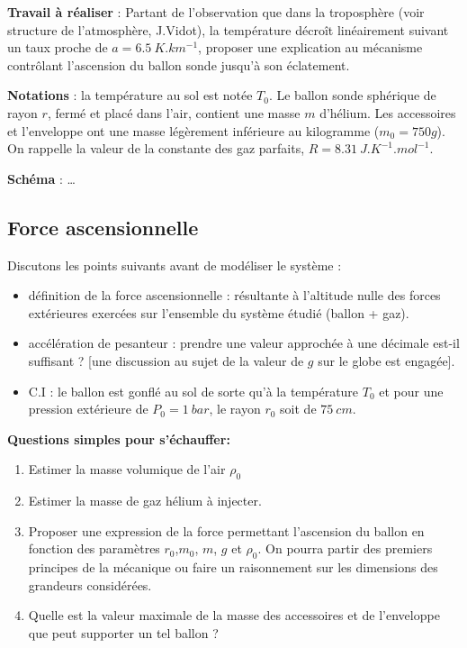 \documentclass[letterpaper]{article}
\begin{document}
\bigskip

\textbf{\textbf{Travail à réaliser}} : Partant de l'observation que dans la troposphère (voir structure de l’atmosphère, J.Vidot), la température décroît linéairement suivant un taux proche de  \(a = 6.5~K.km^{-1}\), proposer une explication au mécanisme contrôlant l'ascension du ballon sonde jusqu'à son éclatement.

\bigskip

\textbf{\textbf{Notations}} : la température au sol est notée \(T_0\). Le ballon sonde sphérique de rayon \(r\), fermé et placé dans l’air, contient une masse \(m\) d’hélium. Les accessoires et l'enveloppe ont une masse légèrement inférieure au kilogramme (\(m_{0} = 750 g\)).
On rappelle la valeur de la constante des gaz parfaits, \(R = 8.31 ~J.K^{-1}.mol^{-1}\).

\bigskip

\textbf{\textbf{Schéma}} : \ldots{}


\newpage

\subsection{Force ascensionnelle}
\label{sec:org6f8fd14}

Discutons les points suivants avant de modéliser le système : 

\begin{itemize}
\item définition de la force ascensionnelle : résultante à l'altitude nulle des forces extérieures exercées sur l'ensemble du système étudié (ballon + gaz).

\item accélération de pesanteur : prendre une valeur approchée à une décimale est-il suffisant ? [une discussion au sujet de la valeur de \(g\) sur le globe est engagée].

\item C.I : le ballon est gonflé au sol de sorte qu’à la température \(T_0\) et pour une pression extérieure de \(P_{0} = 1 ~bar\), le rayon \(r_{0}\) soit de \(75 ~cm\).
\end{itemize}

\textbf{\textbf{Questions simples pour s'échauffer:}}

\begin{enumerate}
\item Estimer la masse volumique de l'air \(\rho_0\)
\item Estimer la masse de gaz hélium à injecter.
\item Proposer une expression de la force permettant l'ascension du ballon en fonction des paramètres  \(r_0\),\(m_0\), \(m\), \(g\) et \({\rho}_0\). On pourra partir des premiers principes de la mécanique ou faire un raisonnement sur les dimensions des grandeurs considérées.
\item Quelle est la valeur maximale de la masse des accessoires et de l’enveloppe que peut supporter un tel ballon  ?
\end{enumerate}
\end{document}
